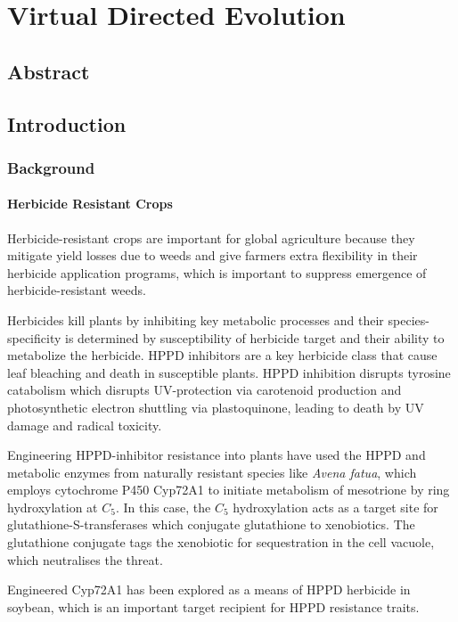 \documentclass[16pt]{book}
\begin{document}
\printbibliography

\chapter{Virtual Directed Evolution}
\section{Abstract}
\section{Introduction}

\subsection{Background}
\subsubsection{Herbicide Resistant Crops}
Herbicide-resistant crops are important for global agriculture because they mitigate yield losses due to weeds and give farmers extra flexibility in their herbicide application programs, which is important to suppress emergence of herbicide-resistant weeds. 

Herbicides kill plants by inhibiting key metabolic processes and their species-specificity is determined by susceptibility of herbicide target and their ability to  metabolize the herbicide. %
HPPD inhibitors are a key herbicide class that cause leaf bleaching and death in susceptible plants. 
HPPD inhibition  disrupts tyrosine catabolism which disrupts UV-protection via carotenoid production and photosynthetic electron shuttling via plastoquinone, leading to death by UV damage and radical toxicity. %

Engineering HPPD-inhibitor resistance into plants have used the HPPD and metabolic enzymes from naturally resistant species like \textit{Avena fatua}, which employs cytochrome P450 Cyp72A1  to initiate metabolism of mesotrione by ring hydroxylation at $C_5$.
In this case, the $C_5$ hydroxylation acts as a target site for glutathione-S-transferases which conjugate glutathione to xenobiotics.
The glutathione conjugate tags the xenobiotic for sequestration in the cell vacuole, which neutralises the threat.

Engineered Cyp72A1 has been explored as a means of HPPD herbicide in soybean, which is an important target recipient for HPPD resistance traits. %
\end{document}
